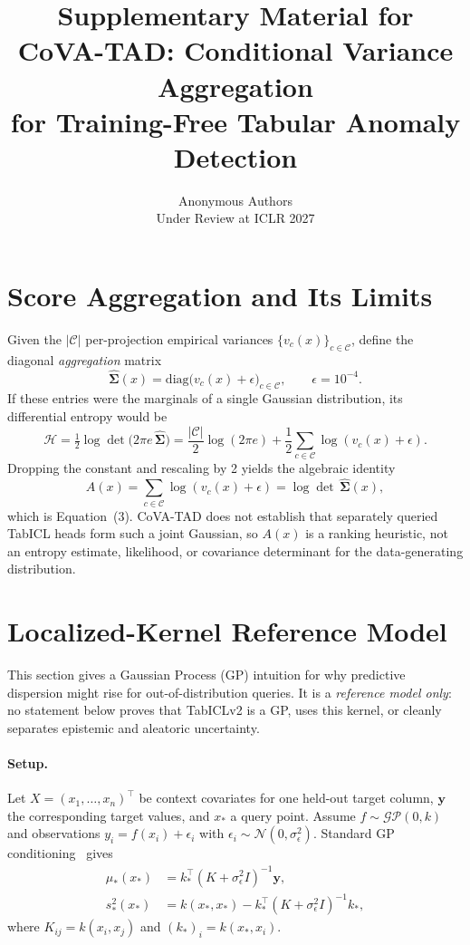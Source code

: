 \documentclass{article}
\title{Supplementary Material for\\CoVA-TAD: Conditional Variance Aggregation\\for Training-Free Tabular Anomaly Detection}
\author{Anonymous Authors \\ Under Review at ICLR 2027}
\begin{document}
\maketitle
\appendix

\section{Score Aggregation and Its Limits}
\label{app:score-deriv}

Given the $|\mathcal{C}|$ per-projection empirical variances $\{v_c(x)\}_{c \in \mathcal{C}}$, define the diagonal \emph{aggregation} matrix
\[
  \widehat{\boldsymbol{\Sigma}}(x) = \mathrm{diag}\bigl(v_c(x) + \epsilon\bigr)_{c \in \mathcal{C}}, \qquad \epsilon = 10^{-4}.
\]
If these entries were the marginals of a single Gaussian distribution, its differential entropy would be
\[
  \mathcal{H} = \tfrac{1}{2}\log\det\!\bigl(2\pi e\,\widehat{\boldsymbol{\Sigma}}\bigr)
              = \frac{|\mathcal{C}|}{2}\log(2\pi e) + \frac{1}{2}\sum_{c \in \mathcal{C}}\log(v_c(x)+\epsilon).
\]
Dropping the constant and rescaling by 2 yields the algebraic identity
\[
  A(x) = \sum_{c \in \mathcal{C}}\log(v_c(x)+\epsilon) = \log\det\,\widehat{\boldsymbol{\Sigma}}(x),
\]
which is Equation~(3). CoVA-TAD does not establish that separately queried TabICL heads form such a joint Gaussian, so $A(x)$ is a ranking heuristic, not an entropy estimate, likelihood, or covariance determinant for the data-generating distribution.

\section{Localized-Kernel Reference Model}
\label{app:gp}

This section gives a Gaussian Process (GP) intuition for why predictive dispersion might rise for out-of-distribution queries. It is a \emph{reference model only}: no statement below proves that TabICLv2 is a GP, uses this kernel, or cleanly separates epistemic and aleatoric uncertainty.

\paragraph{Setup.}
Let $X = (x_1, \ldots, x_n)^\top$ be context covariates for one held-out target column, $\mathbf{y}$ the corresponding target values, and $x_*$ a query point. Assume $f \sim \mathcal{GP}(0, k)$ and observations $y_i = f(x_i) + \epsilon_i$ with $\epsilon_i \sim \mathcal{N}(0, \sigma_\epsilon^2)$. Standard GP conditioning~\citep{rasmussen2006gaussian} gives
\begin{align}
  \mu_*(x_*) &= k_*^\top (K + \sigma_\epsilon^2 I)^{-1} \mathbf{y}, \label{eq:gpmean}\\
  s_*^2(x_*) &= k(x_*, x_*) - k_*^\top (K + \sigma_\epsilon^2 I)^{-1} k_*, \label{eq:gpvar}
\end{align}
where $K_{ij} = k(x_i, x_j)$ and $(k_*)_i = k(x_*, x_i)$.
\end{document}
